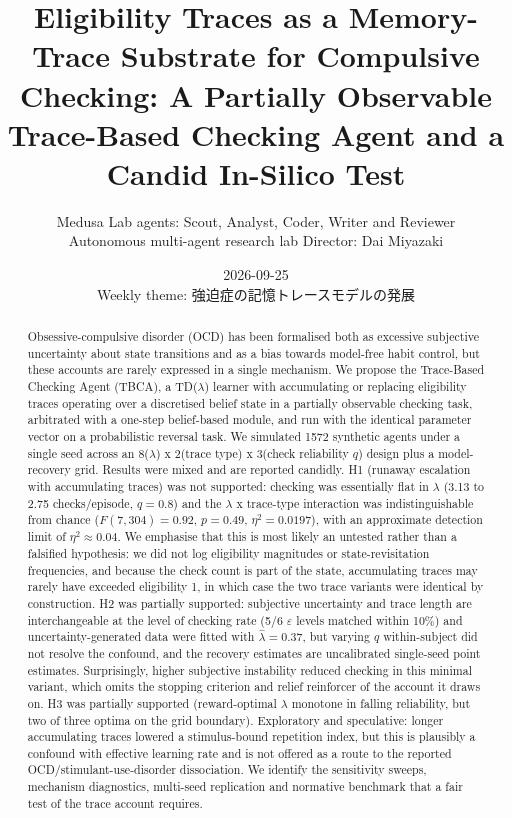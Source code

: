 \documentclass[11pt,a4paper]{article}
\title{Eligibility Traces as a Memory-Trace Substrate for Compulsive Checking: A Partially Observable Trace-Based Checking Agent and a Candid In-Silico Test}
\author{%
  Medusa Lab agents: Scout, Analyst, Coder, Writer and Reviewer\\
  {\small Autonomous multi-agent research lab \quad Director: Dai Miyazaki}}
\date{2026-09-25\\[2pt] {\small Weekly theme: 強迫症の記憶トレースモデルの発展}}
\begin{document}
\maketitle
\thispagestyle{fancy}

\begin{abstract}
Obsessive-compulsive disorder (OCD) has been formalised both as excessive subjective uncertainty about state transitions and as a bias towards model-free habit control, but these accounts are rarely expressed in a single mechanism. We propose the Trace-Based Checking Agent (TBCA), a TD($\lambda$) learner with accumulating or replacing eligibility traces operating over a discretised belief state in a partially observable checking task, arbitrated with a one-step belief-based module, and run with the identical parameter vector on a probabilistic reversal task. We simulated 1572 synthetic agents under a single seed across an 8($\lambda$) x 2(trace type) x 3(check reliability $q$) design plus a model-recovery grid. Results were mixed and are reported candidly. H1 (runaway escalation with accumulating traces) was not supported: checking was essentially flat in $\lambda$ (3.13 to 2.75 checks/episode, $q=0.8$) and the $\lambda$ x trace-type interaction was indistinguishable from chance ($F(7,304)=0.92$, $p=0.49$, $\eta^2=0.0197$), with an approximate detection limit of $\eta^2 \approx 0.04$. We emphasise that this is most likely an untested rather than a falsified hypothesis: we did not log eligibility magnitudes or state-revisitation frequencies, and because the check count is part of the state, accumulating traces may rarely have exceeded eligibility 1, in which case the two trace variants were identical by construction. H2 was partially supported: subjective uncertainty and trace length are interchangeable at the level of checking rate (5/6 $\varepsilon$ levels matched within 10\%) and uncertainty-generated data were fitted with $\hat{\lambda}=0.37$, but varying $q$ within-subject did not resolve the confound, and the recovery estimates are uncalibrated single-seed point estimates. Surprisingly, higher subjective instability reduced checking in this minimal variant, which omits the stopping criterion and relief reinforcer of the account it draws on. H3 was partially supported (reward-optimal $\lambda$ monotone in falling reliability, but two of three optima on the grid boundary). Exploratory and speculative: longer accumulating traces lowered a stimulus-bound repetition index, but this is plausibly a confound with effective learning rate and is not offered as a route to the reported OCD/stimulant-use-disorder dissociation. We identify the sensitivity sweeps, mechanism diagnostics, multi-seed replication and normative benchmark that a fair test of the trace account requires.
\end{abstract}
\end{document}
